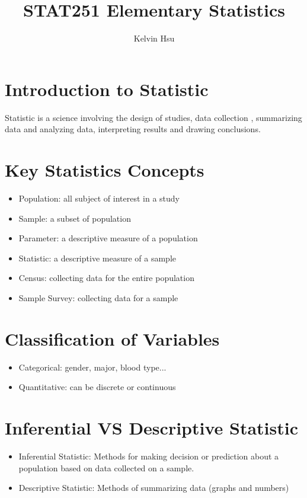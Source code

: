 \documentclass{article}
\title{STAT251 Elementary Statistics}
\author{Kelvin Hsu}
\begin{document}
    \sffamily
       \maketitle
       \newpage
    \section{Introduction to Statistic}
    Statistic is a science involving the design of studies, data collection , summarizing 
    data and analyzing data, interpreting results and drawing conclusions.
    \section*{Key Statistics Concepts}
    \begin{itemize}
        \item Population: all subject of interest in a study
        \item Sample: a subset of population
        \item Parameter: a descriptive measure of a population
        \item Statistic: a descriptive measure of a sample
        \item Census: collecting data for the entire population
        \item Sample Survey: collecting data for a sample
    \end{itemize}

    \section*{Classification of Variables}
    \begin{itemize}
        \item Categorical: gender, major, blood type...
        \item Quantitative: can be discrete or continuous
    \end{itemize}

    \section*{Inferential VS Descriptive Statistic}
    \begin{itemize}
        \item Inferential Statistic: Methods for making decision or prediction about a population based on 
        data collected on a sample.
        \item Descriptive Statistic: Methods of summarizing data (graphs and numbers)
    \end{itemize}
\end{document}
